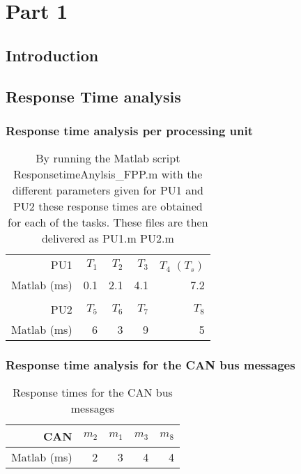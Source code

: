 \chapter{Part 1}

\section{Introduction}

\section{Response Time analysis}




\subsection{Response time analysis per processing unit}

\begin{table}[htbp]
	\centering
	\caption{By running the Matlab script ResponsetimeAnylsis\_FPP.m with the different parameters given for PU1 and PU2 these response times are obtained for each of the tasks. These files are then delivered as PU1.m PU2.m}
	\begin{tabular}{rrrrr}
		& & & & \\
		\toprule
		PU1     & $T_1$    & $T_2$    & $T_3$    & $T_4$  $(T_s)$ \\
		\midrule
		Matlab (ms)      & 0.1     & 2.1     & 4.1     & 7.2 \\
		
		& & & & \\
		\toprule
		PU2     & $T_5$    & $T_6$    & $T_7$    & $T_8$ \\
		\midrule
			Matlab (ms)      & 6       & 3       & 9       & 5 \\
		
	\end{tabular}%
	\label{tab:pu-rt}%
\end{table}%



\subsection{ Response time analysis for the CAN bus messages}

\begin{table}[htbp]
	\centering
	\caption{Response times for the CAN bus messages}
	\begin{tabular}{rrrrr}
		\toprule
		CAN     & $m_2$   & $m_1$   & $m_3$   & $m_8$ \\
		\midrule
		Matlab (ms) & 2       & 3       & 4       & 4 \\
		
	\end{tabular}%
	\label{tab:can-rt}%
\end{table}%

